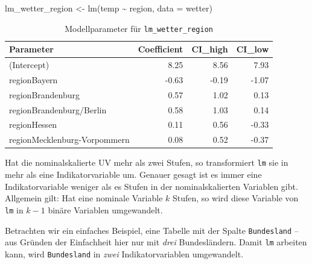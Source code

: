 \documentclass[
  letterpaper,
  twoside,
  open=any]{scrbook}
\newenvironment{Shaded}{\begin{snugshade}}{\end{snugshade}}
\newcommand{\AttributeTok}[1]{\textcolor[rgb]{0.40,0.45,0.13}{#1}}
\newcommand{\FunctionTok}[1]{\textcolor[rgb]{0.28,0.35,0.67}{#1}}
\newcommand{\NormalTok}[1]{\textcolor[rgb]{0.00,0.23,0.31}{#1}}
\newcommand{\OtherTok}[1]{\textcolor[rgb]{0.00,0.23,0.31}{#1}}
\newcommand{\SpecialCharTok}[1]{\textcolor[rgb]{0.37,0.37,0.37}{#1}}
\theoremstyle{definition}
\theoremstyle{definition}
\theoremstyle{definition}
\theoremstyle{remark}
\begin{document}
\begin{Shaded}
\begin{Highlighting}[]
\NormalTok{lm\_wetter\_region }\OtherTok{\textless{}{-}} \FunctionTok{lm}\NormalTok{(temp }\SpecialCharTok{\textasciitilde{}}\NormalTok{ region, }\AttributeTok{data =}\NormalTok{ wetter)}
\end{Highlighting}
\end{Shaded}

\begin{longtable}[]{@{}lrrr@{}}

\caption{\label{tbl-lm_wetter_region}Modellparameter für
\texttt{lm\_wetter\_region}}

\tabularnewline

\toprule\noalign{}
Parameter & Coefficient & CI\_high & CI\_low \\
\midrule\noalign{}
\endhead
\bottomrule\noalign{}
\endlastfoot
(Intercept) & 8.25 & 8.56 & 7.93 \\
regionBayern & -0.63 & -0.19 & -1.07 \\
regionBrandenburg & 0.57 & 1.02 & 0.13 \\
regionBrandenburg/Berlin & 0.58 & 1.03 & 0.14 \\
regionHessen & 0.11 & 0.56 & -0.33 \\
regionMecklenburg-Vorpommern & 0.08 & 0.52 & -0.37 \\

\end{longtable}

Hat die nominalskalierte UV mehr als zwei Stufen, so transformiert
\texttt{lm} sie in mehr als eine Indikatorvariable um. Genauer gesagt
ist es immer eine Indikatorvariable weniger als es Stufen in der
nominalskalierten Variablen gibt. Allgemein gilt: Hat eine nominale
Variable \(k\) Stufen, so wird diese Variable von \texttt{lm} in \(k-1\)
binäre Variablen umgewandelt.

Betrachten wir ein einfaches Beispiel, eine Tabelle mit der Spalte
\texttt{Bundesland} -- aus Gründen der Einfachheit hier nur mit
\emph{drei} Bundesländern. Damit \texttt{lm} arbeiten kann, wird
\texttt{Bundesland} in \emph{zwei} Indikatorvariablen umgewandelt.
\end{document}
